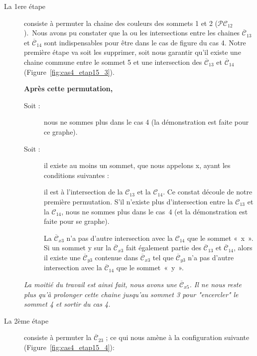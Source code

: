 \begin{description}
\item [La 1ere étape] consiste à permuter la chaine des couleurs des sommets 1 et 2 ($\mathcal{PC}_{12}$).\
Nous avons pu constater que la ou les intersections entre les chaines $\overline{\mathcal{C}}_{13}$ et $\overline{\mathcal{C}}_{14}$ sont indispensables pour être dans le cas de figure du cas 4. Notre première étape va soit les supprimer, soit nous garantir qu'il existe une chaine commune entre le sommet 5 et une intersection des $\overline{\mathcal{C}}_{13}$ et $\overline{\mathcal{C}}_{14}$ (Figure~\ref{fig:cas4_etap15_3}).
	\begin{changemargin}{0cm}{0cm}

\textbf{Après cette permutation,}
\begin{description}
\item[Soit :] nous ne sommes plus dans le cas 4 (la démonstration est faite pour ce graphe).
\item[Soit :] il existe au moins un sommet, que nous appelons x, ayant les conditions suivantes :\\
\item[]il est à l’intersection de la $\mathcal{C}_{13}$ et la $\mathcal{C}_{14}$.
Ce constat découle de notre première permutation. S’il n’existe plus d’intersection entre la $\mathcal{C}_{13}$ et la $\mathcal{C}_{14}$, nous ne sommes plus dans le cas~4 (et la démonstration est faite pour se graphe).\\
\item[]La $\overline{\mathcal{C}}_{x3}$ n’a pas d’autre intersection avec la $\mathcal{C}_{14}$ que le sommet «~x~».\\
Si un sommet y sur la $\overline{\mathcal{C}}_{x3}$ fait également partie des $\overline{\mathcal{C}}_{13}$ et $\overline{\mathcal{C}}_{14}$, alors il existe une $\overline{\mathcal{C}}_{y3}$ contenue dans $\overline{\mathcal{C}}_{x3}$ tel que $\overline{\mathcal{C}}_{y3}$ n'a pas d’autre intersection avec la $\overline{\mathcal{C}}_{14}$ que le sommet~«~y~».\\
\end{description}
	\end{changemargin}

\textit{La moitié du travail est ainsi fait, nous avons une $\overline{\mathcal{C}}_{x5}$. Il ne nous reste plus qu'à prolonger cette chaine jusqu'au sommet 3 pour "encercler" le sommet 4 et sortir du cas 4.}\\

\item [La 2ème étape] consiste à permuter la $\overline{\mathcal{C}}_{23}$ ; ce qui nous amène à la
configuration suivante (Figure~\ref{fig:cas4_etap15_4}):\


\end{description}
